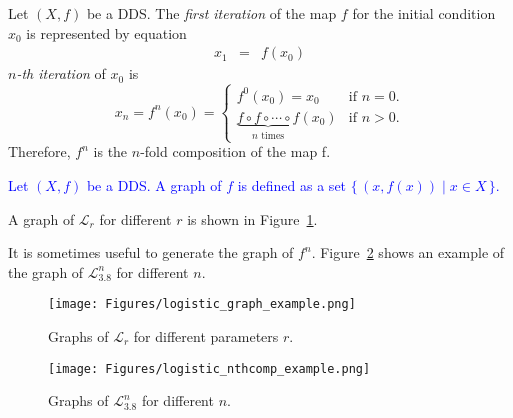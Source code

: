 \begin{definition}
    Let $\left( X, f \right)$ be a DDS. 
    The \emph{first iteration} of the map $f$ for the initial condition $x_0$ is represented by equation
    \begin{eqnarray}
        x_{1}  & = & f(x_{0})
    \end{eqnarray}
    \emph{$n$-th iteration} of $x_0$ is
    \begin{equation}
    x_{n} = f^{n}(x_0) =
        \begin{cases}
            f^{0}(x_0) = x_0 & \text{if } n = 0. \\
            \underbrace{f \circ f \circ \cdots \circ f}_\text{$n$ times}(x_0) & \text{if } n > 0. 
        \end{cases}
    \end{equation}
    Therefore, $f^{n}$ is the $n$-fold composition of the map f.
\end{definition}

\begin{definition}[Graph]
\textcolor{blue}{
    Let $\left( X, f \right)$ be a DDS. A graph of $f$ is defined as a set $\{\, (x, f(x)) \mid x \in X \,\}$.
}
\end{definition}

\begin{remark}
    A graph of $\mathcal{L}_{r}$ for different $r$ is shown in Figure~\ref{fig:logistic_graph_example}.
    \par
    It is sometimes useful to generate the graph of $f^{n}$.
    Figure~\ref{fig:logistic_nthcomp_example} shows an example of the graph of $\mathcal{L}_{3.8}^{n}$ for different $n$.
\end{remark}

\begin{figure}[!h]
    \centering
    \texttt{[image: Figures/logistic\_graph\_example.png]}
    \caption{
        Graphs of $\mathcal{L}_{r}$ for different parameters $r$.
    }
    \label{fig:logistic_graph_example}
\end{figure}

\begin{figure}[!h]
    \centering
    \texttt{[image: Figures/logistic\_nthcomp\_example.png]}
    \caption{
        Graphs of $\mathcal{L}_{3.8}^{n}$ for different $n$.
    }
    \label{fig:logistic_nthcomp_example}
\end{figure}

